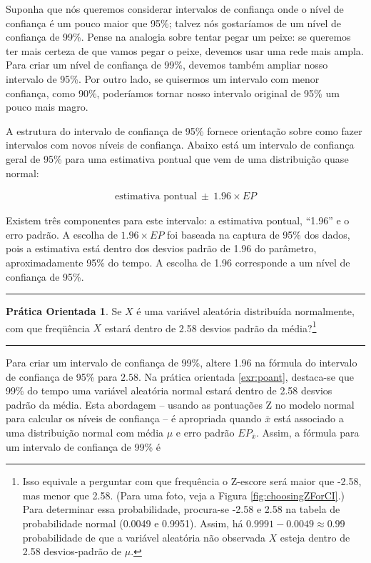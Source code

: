 \documentclass[
]{book}
\theoremstyle{definition}
\theoremstyle{definition}
\theoremstyle{definition}
\newtheorem{exercise}{Prática Orientada}[chapter]
\theoremstyle{definition}
\theoremstyle{remark}
\begin{document}
Suponha que nós queremos considerar intervalos de confiança onde o nível de confiança é um pouco maior que 95\%; talvez nós gostaríamos de um nível de confiança de 99\%. Pense na analogia sobre tentar pegar um peixe: se queremos ter mais certeza de que vamos pegar o peixe, devemos usar uma rede mais ampla. Para criar um nível de confiança de 99\%, devemos também ampliar nosso intervalo de 95\%. Por outro lado, se quisermos um intervalo com menor confiança, como 90\%, poderíamos tornar nosso intervalo original de 95\% um pouco mais magro.

A estrutura do intervalo de confiança de 95\% fornece orientação sobre como fazer intervalos com novos níveis de confiança. Abaixo está um intervalo de confiança geral de 95\% para uma estimativa pontual que vem de uma distribuição quase normal:

\begin{eqnarray}
\text{estimativa pontual}\ \pm\ 1.96\times EP
\end{eqnarray}

Existem três componentes para este intervalo: a estimativa pontual, ``1.96'' e o erro padrão. A escolha de \(1.96\times EP\) foi baseada na captura de 95\% dos dados, pois a estimativa está dentro dos desvios padrão de 1.96 do parâmetro, aproximadamente 95\% do tempo. A escolha de 1.96 corresponde a um nível de confiança de 95\%.

\begin{center}\rule{0.5\linewidth}{0.5pt}\end{center}

\begin{exercise}
\protect\hypertarget{exr:poant}{}{\label{exr:poant} }Se \(X\) é uma variável aleatória distribuída normalmente, com que freqüência \(X\) estará dentro de 2.58 desvios padrão da média?\footnote{Isso equivale a perguntar com que frequência o Z-escore será maior que -2.58, mas menor que 2.58. (Para uma foto, veja a Figura \ref{fig:choosingZForCI}.) Para determinar essa probabilidade, procura-se -2.58 e 2.58 na tabela de probabilidade normal (0.0049 e 0.9951). Assim, há \(0.9991-0.0049 \approx 0.99\) probabilidade de que a variável aleatória não observada \(X\) esteja dentro de 2.58 desvios-padrão de \(\mu\).}
\end{exercise}

\begin{center}\rule{0.5\linewidth}{0.5pt}\end{center}

Para criar um intervalo de confiança de 99\%, altere 1.96 na fórmula do intervalo de confiança de 95\% para \(2.58\). Na prática orientada \ref{exr:poant}, destaca-se que 99\% do tempo uma variável aleatória normal estará dentro de 2.58 desvios padrão da média. Esta abordagem -- usando as pontuações Z no modelo normal para calcular os níveis de confiança -- é apropriada quando \(\bar{x}\) está associado a uma distribuição normal com média \(\mu\) e erro padrão \(EP_{\bar{x}}\). Assim, a fórmula para um intervalo de confiança de 99\% é
\end{document}

